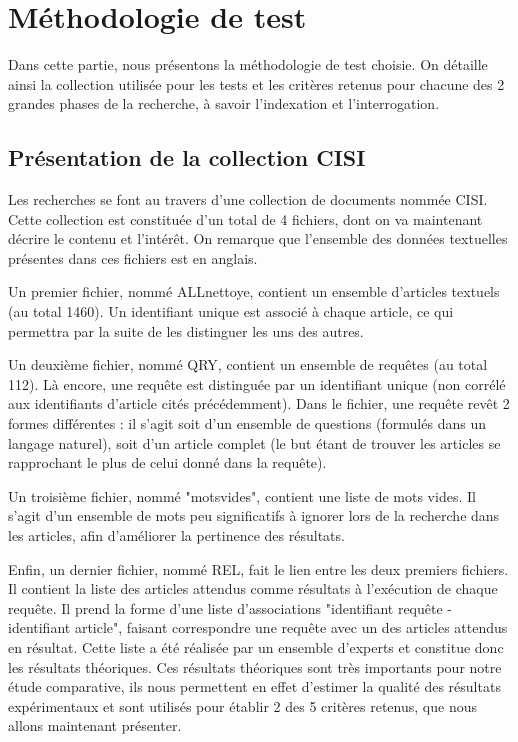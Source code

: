 \section{Méthodologie de test}

Dans cette partie, nous présentons la méthodologie de test choisie. On détaille ainsi la collection utilisée pour les tests et les critères retenus pour chacune des 2 grandes phases de la recherche, à savoir l’indexation et l’interrogation.

\subsection{Présentation de la collection CISI}

Les recherches se font au travers d'une collection de documents nommée CISI. Cette collection est constituée d’un total de 4 fichiers, dont on va maintenant décrire le contenu et l’intérêt. On remarque que l’ensemble des données textuelles présentes dans ces fichiers est en anglais.

Un premier fichier, nommé ALLnettoye, contient un ensemble d'articles textuels (au total 1460). Un identifiant unique est associé à chaque article, ce qui permettra par la suite de les distinguer les uns des autres.

Un deuxième fichier, nommé QRY, contient un ensemble de requêtes (au total 112). Là encore, une requête est distinguée par un identifiant unique (non corrélé aux identifiants d’article cités précédemment). Dans le fichier, une requête revêt 2 formes différentes : il s’agit soit d’un ensemble de questions (formulés dans un langage naturel), soit d’un article complet (le but étant de trouver les articles se rapprochant le plus de celui donné dans la requête). 

Un troisième fichier, nommé "motsvides", contient une liste de mots vides. Il s’agit d’un ensemble de mots peu significatifs à ignorer lors de la recherche dans les articles, afin d’améliorer la pertinence des résultats.

Enfin, un dernier fichier, nommé REL, fait le lien entre les deux premiers fichiers. Il contient la liste des articles attendus comme résultats à l'exécution de chaque requête. Il prend la forme d'une liste d'associations "identifiant requête - identifiant article", faisant correspondre une requête avec un des articles attendus en résultat. Cette liste a été réalisée par un ensemble d'experts et constitue donc les résultats théoriques. Ces résultats théoriques sont très importants pour notre étude comparative, ils nous permettent en effet d’estimer la qualité des résultats expérimentaux et sont utilisés pour établir 2 des 5 critères retenus, que nous allons maintenant présenter.

